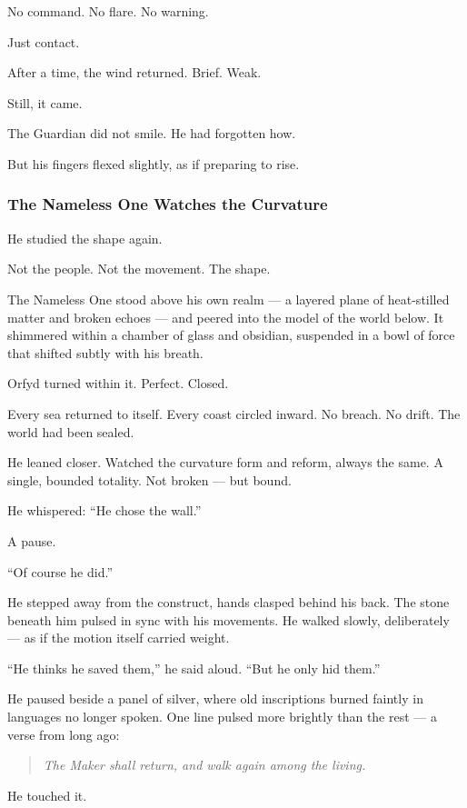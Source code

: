 \documentclass[12pt]{article}
\begin{document}
No command. No flare. No warning.

Just contact.

After a time, the wind returned. Brief. Weak.

Still, it came.

The Guardian did not smile. He had forgotten how.

But his fingers flexed slightly, as if preparing to rise.

\dotfill

\subsubsection{The Nameless One Watches the Curvature}

He studied the shape again.

Not the people. Not the movement. The shape.

The Nameless One stood above his own realm — a layered plane of heat-stilled matter and broken echoes — and peered into the model of the world below. It shimmered within a chamber of glass and obsidian, suspended in a bowl of force that shifted subtly with his breath.

Orfyd turned within it. Perfect. Closed.

Every sea returned to itself. Every coast circled inward. No breach. No drift. The world had been sealed.

He leaned closer. Watched the curvature form and reform, always the same. A single, bounded totality. Not broken — but bound.

He whispered: ``He chose the wall.''

A pause.

``Of course he did.''

He stepped away from the construct, hands clasped behind his back. The stone beneath him pulsed in sync with his movements. He walked slowly, deliberately — as if the motion itself carried weight.

``He thinks he saved them,'' he said aloud. ``But he only hid them.''

He paused beside a panel of silver, where old inscriptions burned faintly in languages no longer spoken. One line pulsed more brightly than the rest — a verse from long ago:

\begin{quote}
\emph{The Maker shall return, and walk again among the living.}
\end{quote}

He touched it.
\end{document}
